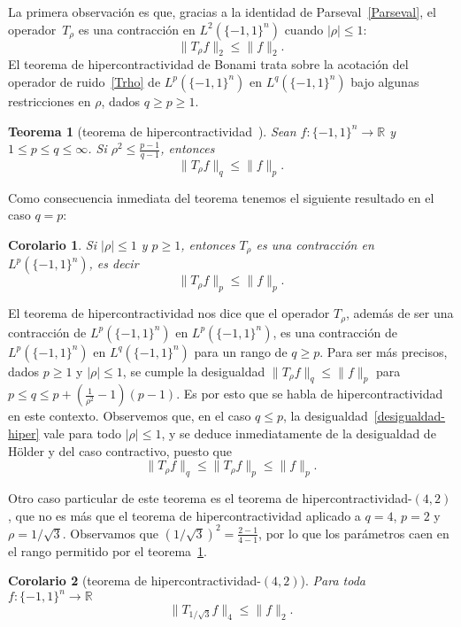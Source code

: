 \documentclass[autocontact]{gaceta}
\newcommand{\R}{\mathbb{R}}
\newtheorem{theorem}{Teorema}
\newtheorem{corollary}{Corolario}
\begin{document}
La primera observación es que, gracias a la identidad de Parseval~\eqref{Parseval}, el operador~$T_{\rho}$ es una contracción en $L^2(\{-1,1\}^n)$ cuando $|\rho|\leq 1$:
\[
\|T_{\rho}f \|_2 \leq \|f\|_2.
\]
El teorema de hipercontractividad de Bonami trata sobre la acotación del operador de ruido~\eqref{Trho} de $L^p(\{-1,1\}^n)$ en $L^q(\{-1,1\}^n)$ bajo algunas restricciones en $\rho$, dados $q\geq p\geq 1$.

\begin{theorem}[teorema de hipercontractividad~\cite{Bon70}]
\label{thm:hypercontractivity}
Sean $f:\{-1,1\}^n\to \R$ y $1\leq p \leq q \leq \infty$. Si $\rho^2 \leq \frac{p-1}{q-1}$, entonces
\begin{equation}\label{desigualdad-hiper}
\|T_{\rho} f\|_q\leq \|f\|_p.
\end{equation}
\end{theorem}

Como consecuencia inmediata del teorema tenemos el siguiente resultado en el caso $q=p$:

\begin{corollary}
Si $|\rho|\leq 1$ y $p\geq 1$, entonces $T_{\rho}$ es una contracción en $L^p(\{-1,1\}^n)$, es decir
\[
\|T_{\rho}f \|_p \leq \|f\|_p.
\]
\end{corollary}

El teorema de hipercontractividad nos dice que el operador $T_\rho$, además de ser una contracción de $L^p(\{-1,1\}^n)$ en $L^p(\{-1,1\}^n)$, es una contracción de $L^p(\{-1,1\}^n)$ en $L^q(\{-1,1\}^n)$ para un rango de $q\geq p$. Para ser más precisos, dados $p\geq 1$ y $|\rho |\leq 1$, se cumple la desigualdad $\|T_{\rho}f\|_q\leq \|f\|_p$ para $p\leq q \leq p + \left( \frac{1}{\rho^2} - 1\right) (p-1)$. Es por esto que se habla de hipercontractividad en este contexto.
Observemos que, en el caso $q\leq p$, la desigualdad~\eqref{desigualdad-hiper} vale para todo $|\rho|\leq 1$, y se deduce inmediatamente de la desigualdad de Hölder y del caso contractivo, puesto que
\[
\|T_{\rho}f\|_q\leq \|T_{\rho}f\|_p\leq \|f\|_p.
\]

Otro caso particular de este teorema es el teorema de hipercontractividad-$(4,2)$, que no es más que el teorema de hipercontractividad aplicado a $q=4$, $p=2$ y $\rho=1/\sqrt{3}$. Observamos que $\left( 1/\sqrt{3}\right)^2 = \frac{2-1}{4-1}$, por lo que los parámetros caen en el rango permitido por el teorema~\ref{thm:hypercontractivity}.

\begin{corollary}[teorema de hipercontractividad-$(4,2)$]
\label{cor:(4,2)-hypercontractivity}
Para toda $f:\{-1,1\}^n\to \R$
\[
\| T_{1/\sqrt{3}}f\|_4\leq \|f\|_2.
\]
\end{corollary}
\end{document}

